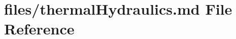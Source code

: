 \hypertarget{thermalHydraulics_8md}{}\section{files/thermal\+Hydraulics.md File Reference}
\label{thermalHydraulics_8md}
